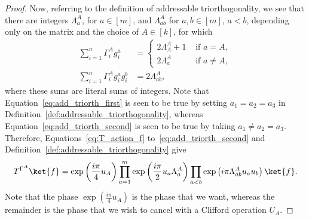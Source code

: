 \documentclass[11pt]{article}
\theoremstyle{definition}
\begin{document}
\begin{proof}
    Now, referring to the definition of addressable triorthogonality, we see that there are integers $\Lambda_a^A$, for $a \in [m]$, and $\Lambda_{ab}^A$ for $a,b \in [m]$, $a<b$, depending only on the matrix and the choice of $A \in [k]$, for which
    \begin{align}\label{eq:add_triorth_first}
        \sum_{i=1}^n\Gamma_i^Ag_i^a &= \begin{cases}
            2\Lambda_A^A+1 &\text{ if } a=A,\\
            2\Lambda_a^A &\text{ if } a \neq A,
        \end{cases}\\\label{eq:add_triorth_second}
        \sum_{i=1}^n\Gamma_i^Ag_i^ag_i^b &= 2\Lambda_{ab}^A,
    \end{align}
    where these sums are literal sums of integers. Note that Equation~\eqref{eq:add_triorth_first} is seen to be true by setting $a_1=a_2=a_3$ in Definition~\ref{def:addressable_triorthogonality}, whereas Equation~\eqref{eq:add_triorth_second} is seen to be true by taking $a_1 \neq a_2 = a_3$. Therefore, Equations~\eqref{eq:T_action_f} to~\eqref{eq:add_triorth_second} and Definition~\ref{def:addressable_triorthogonality} give
    \begin{equation}
        T^{\Gamma^A}\ket{f} = \exp\left(\frac{i\pi}{4}u_A\right)\prod_{a=1}^m\exp\left(\frac{i\pi}{2}u_a\Lambda^A_a\right)\prod_{a<b}\exp\left(i\pi\Lambda^A_{ab}u_au_b\right)\ket{f}.
    \end{equation}
    Note that the phase $\exp\left(\frac{i\pi}{4}u_A\right)$ is the phase that we want, whereas the remainder is the phase that we wish to cancel with a Clifford operation $U_A$.


\end{proof}
\end{document}
